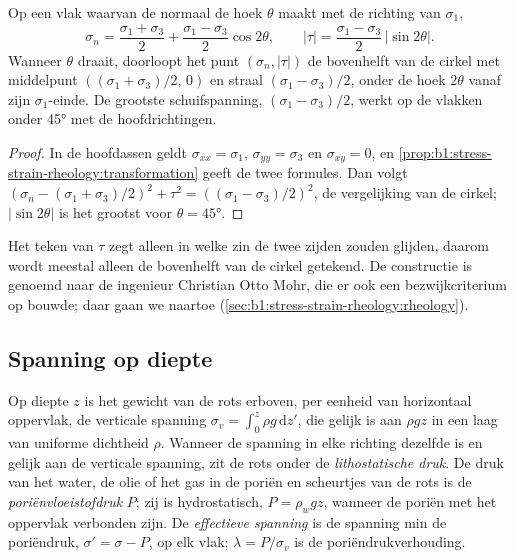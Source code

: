 \begin{proposition}\label{prop:b1:stress-strain-rheology:mohr}
Op een vlak waarvan de normaal de hoek $\theta$ maakt met de richting van $\sigma_1$,
\[
  \sigma_n = \frac{\sigma_1+\sigma_3}{2} + \frac{\sigma_1-\sigma_3}{2}\cos2\theta,
  \qquad
  |\tau| = \frac{\sigma_1-\sigma_3}{2}\,|\sin2\theta| .
\]
Wanneer $\theta$ draait, doorloopt het punt $(\sigma_n, |\tau|)$ de bovenhelft van de cirkel met middelpunt $((\sigma_1+\sigma_3)/2,\, 0)$ en straal $(\sigma_1-\sigma_3)/2$, onder de hoek $2\theta$ vanaf zijn $\sigma_1$-einde. De grootste schuifspanning, $(\sigma_1-\sigma_3)/2$, werkt op de vlakken onder \ang{45} met de hoofdrichtingen.
\end{proposition}

\begin{proof}
In de hoofdassen geldt $\sigma_{xx} = \sigma_1$, $\sigma_{yy} = \sigma_3$ en $\sigma_{xy} = 0$, en \cref{prop:b1:stress-strain-rheology:transformation} geeft de twee formules. Dan volgt $(\sigma_n - (\sigma_1+\sigma_3)/2)^2 + \tau^2 = ((\sigma_1-\sigma_3)/2)^2$, de vergelijking van de cirkel; $|\sin2\theta|$ is het grootst voor $\theta = \ang{45}$.
\end{proof}

Het teken van $\tau$ zegt alleen in welke zin de twee zijden zouden glijden, daarom wordt meestal alleen de bovenhelft van de cirkel getekend. De constructie is genoemd naar de ingenieur Christian Otto Mohr, die er ook een bezwijkcriterium op bouwde; daar gaan we naartoe (\cref{sec:b1:stress-strain-rheology:rheology}).

\subsection*{Spanning op diepte}

\begin{definition}\label{def:b1:stress-strain-rheology:lithostatic}
Op diepte $z$ is het gewicht van de rots erboven, per eenheid van horizontaal oppervlak, de verticale spanning $\sigma_v = \int_0^z\rho g\,\mathrm dz'$, die gelijk is aan $\rho g z$ in een laag van uniforme dichtheid $\rho$.
Wanneer de spanning in elke richting dezelfde is en gelijk aan de verticale spanning, zit de rots onder de \emph{lithostatische druk}. De druk van het water, de olie of het gas in de poriën en scheurtjes van de rots is de \emph{poriënvloeistofdruk} $P$; zij is hydrostatisch, $P = \rho_w g z$, wanneer de poriën met het oppervlak verbonden zijn. De \emph{effectieve spanning} is de spanning min de poriëndruk, $\sigma' = \sigma - P$, op elk vlak; $\lambda = P/\sigma_v$ is de poriëndrukverhouding.
\end{definition}

